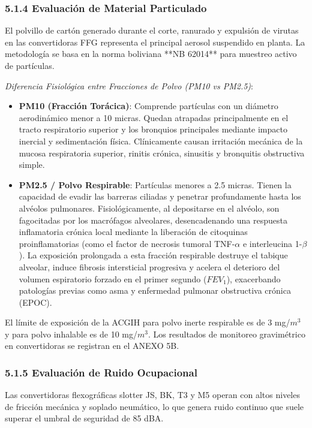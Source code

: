 \documentclass[11pt, letterpaper]{article}
\begin{document}
\subsubsection{5.1.4 Evaluación de Material Particulado}
El polvillo de cartón generado durante el corte, ranurado y expulsión de virutas en las convertidoras FFG representa el principal aerosol suspendido en planta. La metodología se basa en la norma boliviana **NB 62014** para muestreo activo de partículas.

\textit{Diferencia Fisiológica entre Fracciones de Polvo (PM10 vs PM2.5)}:
\begin{itemize}
    \item \textbf{PM10 (Fracción Torácica)}: Comprende partículas con un diámetro aerodinámico menor a 10 micras. Quedan atrapadas principalmente en el tracto respiratorio superior y los bronquios principales mediante impacto inercial y sedimentación física. Clínicamente causan irritación mecánica de la mucosa respiratoria superior, rinitis crónica, sinusitis y bronquitis obstructiva simple.
    \item \textbf{PM2.5 / Polvo Respirable}: Partículas menores a 2.5 micras. Tienen la capacidad de evadir las barreras ciliadas y penetrar profundamente hasta los alvéolos pulmonares. Fisiológicamente, al depositarse en el alvéolo, son fagocitadas por los macrófagos alveolares, desencadenando una respuesta inflamatoria crónica local mediante la liberación de citoquinas proinflamatorias (como el factor de necrosis tumoral TNF-$\alpha$ e interleucina 1-$\beta$). La exposición prolongada a esta fracción respirable destruye el tabique alveolar, induce fibrosis intersticial progresiva y acelera el deterioro del volumen espiratorio forzado en el primer segundo ($FEV_1$), exacerbando patologías previas como asma y enfermedad pulmonar obstructiva crónica (EPOC).
\end{itemize}

El límite de exposición de la ACGIH para polvo inerte respirable es de 3 mg/$m^3$ y para polvo inhalable es de 10 mg/$m^3$. Los resultados de monitoreo gravimétrico en convertidoras se registran en el ANEXO 5B.

\subsubsection{5.1.5 Evaluación de Ruido Ocupacional}
Las convertidoras flexográficas slotter JS, BK, T3 y M5 operan con altos niveles de fricción mecánica y soplado neumático, lo que genera ruido continuo que suele superar el umbral de seguridad de 85 dBA.
\end{document}
